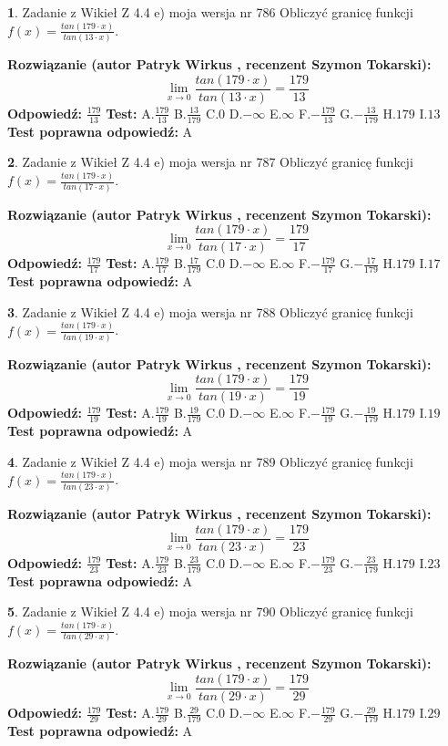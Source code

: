 \documentclass[12pt, a4paper]{article}
\theoremstyle{definition} %
\newtheorem{zad}{}
\newcommand{\zadStart}[1]{\begin{zad}#1\newline}
\newcommand{\zadStop}{\end{zad}}
\newcommand{\rozwStart}[2]{\noindent \textbf{Rozwiązanie (autor #1 , recenzent #2): }\newline}
\newcommand{\rozwStop}{\newline}
\newcommand{\odpStart}{\noindent \textbf{Odpowiedź:}\newline}
\newcommand{\odpStop}{\newline}
\newcommand{\testStart}{\noindent \textbf{Test:}\newline}
\newcommand{\testStop}{\newline}
\newcommand{\kluczStart}{\noindent \textbf{Test poprawna odpowiedź:}\newline}
\newcommand{\kluczStop}{\newline}
\begin{document}
\zadStart{Zadanie z Wikieł Z 4.4 e) moja wersja nr 786}
Obliczyć granicę funkcji $f(x)=\frac{tan(179\cdot x)}{tan(13\cdot x)}$.
\zadStop
\rozwStart{Patryk Wirkus}{Szymon Tokarski}
$$\lim\limits_{x\to 0}\frac{tan(179\cdot x)}{tan(13\cdot x)}=
\frac{179}{13}$$
\rozwStop
\odpStart
$\frac{179}{13}$
\odpStop
\testStart
A.$\frac{179}{13}$
B.$\frac{13}{179}$
C.$0$
D.$-\infty$
E.$\infty$
F.$-\frac{179}{13}$
G.$-\frac{13}{179}$
H.$179$
I.$13$
\testStop
\kluczStart
A
\kluczStop



\zadStart{Zadanie z Wikieł Z 4.4 e) moja wersja nr 787}
Obliczyć granicę funkcji $f(x)=\frac{tan(179\cdot x)}{tan(17\cdot x)}$.
\zadStop
\rozwStart{Patryk Wirkus}{Szymon Tokarski}
$$\lim\limits_{x\to 0}\frac{tan(179\cdot x)}{tan(17\cdot x)}=
\frac{179}{17}$$
\rozwStop
\odpStart
$\frac{179}{17}$
\odpStop
\testStart
A.$\frac{179}{17}$
B.$\frac{17}{179}$
C.$0$
D.$-\infty$
E.$\infty$
F.$-\frac{179}{17}$
G.$-\frac{17}{179}$
H.$179$
I.$17$
\testStop
\kluczStart
A
\kluczStop



\zadStart{Zadanie z Wikieł Z 4.4 e) moja wersja nr 788}
Obliczyć granicę funkcji $f(x)=\frac{tan(179\cdot x)}{tan(19\cdot x)}$.
\zadStop
\rozwStart{Patryk Wirkus}{Szymon Tokarski}
$$\lim\limits_{x\to 0}\frac{tan(179\cdot x)}{tan(19\cdot x)}=
\frac{179}{19}$$
\rozwStop
\odpStart
$\frac{179}{19}$
\odpStop
\testStart
A.$\frac{179}{19}$
B.$\frac{19}{179}$
C.$0$
D.$-\infty$
E.$\infty$
F.$-\frac{179}{19}$
G.$-\frac{19}{179}$
H.$179$
I.$19$
\testStop
\kluczStart
A
\kluczStop



\zadStart{Zadanie z Wikieł Z 4.4 e) moja wersja nr 789}
Obliczyć granicę funkcji $f(x)=\frac{tan(179\cdot x)}{tan(23\cdot x)}$.
\zadStop
\rozwStart{Patryk Wirkus}{Szymon Tokarski}
$$\lim\limits_{x\to 0}\frac{tan(179\cdot x)}{tan(23\cdot x)}=
\frac{179}{23}$$
\rozwStop
\odpStart
$\frac{179}{23}$
\odpStop
\testStart
A.$\frac{179}{23}$
B.$\frac{23}{179}$
C.$0$
D.$-\infty$
E.$\infty$
F.$-\frac{179}{23}$
G.$-\frac{23}{179}$
H.$179$
I.$23$
\testStop
\kluczStart
A
\kluczStop



\zadStart{Zadanie z Wikieł Z 4.4 e) moja wersja nr 790}
Obliczyć granicę funkcji $f(x)=\frac{tan(179\cdot x)}{tan(29\cdot x)}$.
\zadStop
\rozwStart{Patryk Wirkus}{Szymon Tokarski}
$$\lim\limits_{x\to 0}\frac{tan(179\cdot x)}{tan(29\cdot x)}=
\frac{179}{29}$$
\rozwStop
\odpStart
$\frac{179}{29}$
\odpStop
\testStart
A.$\frac{179}{29}$
B.$\frac{29}{179}$
C.$0$
D.$-\infty$
E.$\infty$
F.$-\frac{179}{29}$
G.$-\frac{29}{179}$
H.$179$
I.$29$
\testStop
\kluczStart
A
\kluczStop
\end{document}
